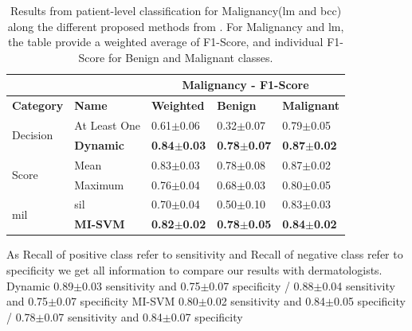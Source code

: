 \documentclass[journal,article,submit,moreauthors,pdftex, applsci]{Definitions/mdpi}
\begin{document}
\begin{table}[h]
    \centering
    \begin{tabular}{lllll}
                                &                   & \multicolumn{3}{c}{\textbf{Malignancy - F1-Score}}                    \\ \hline
    \textbf{Category}           & \textbf{Name}     & \textbf{Weighted}     & \textbf{Benign}       & \textbf{Malignant}    \\ \hline
    \multirow{2}{*}{Decision}   & At Least One      & 0.61$\pm$0.06         & 0.32$\pm$0.07         & 0.79$\pm$0.05         \\ \cline{2-5} 
                                & \textbf{Dynamic}  & \textbf{0.84$\pm$0.03}& \textbf{0.78$\pm$0.07}& \textbf{0.87$\pm$0.02}\\ \hline 
    \multirow{2}{*}{Score}      & Mean              & 0.83$\pm$0.03         & 0.78$\pm$0.08         & 0.87$\pm$0.02         \\ \cline{2-5}
                                & Maximum           & 0.76$\pm$0.04         & 0.68$\pm$0.03         & 0.80$\pm$0.05         \\ \hline  
    \multirow{2}{*}{\ac{mil}}   & \ac{sil}          & 0.70$\pm$0.04         & 0.50$\pm$0.10         & 0.83$\pm$0.03         \\ \cline{2-5} 
                                & \textbf{MI-SVM}   & \textbf{0.82$\pm$0.02}& \textbf{0.78$\pm$0.05}& \textbf{0.84$\pm$0.02}\\ \hline 
    \end{tabular}    
    \caption{Results from patient-level classification for Malignancy(\ac{lm} and \ac{bcc}) along the different proposed methods from . For Malignancy and \ac{lm}, the table provide a weighted average of F1-Score, and individual F1-Score for Benign and Malignant classes.}
    \label{tab:patient_results}
\end{table}\par
As Recall of positive class refer to sensitivity and Recall of negative class refer to specificity we get all information to compare our results with dermatologists.   
Dynamic 0.89$\pm$0.03 sensitivity and 0.75$\pm$0.07 specificity /  0.88$\pm$0.04 sensitivity and 0.75$\pm$0.07 specificity
MI-SVM 0.80$\pm$0.02 sensitivity and 0.84$\pm$0.05  specificity /  0.78$\pm$0.07 sensitivity and 0.84$\pm$0.07 specificity
\end{document}
